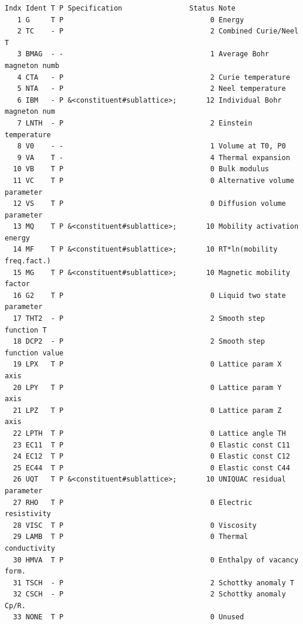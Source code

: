 \documentclass[11pt]{article}
\begin{document}
\begin{table}[!h]
  \caption{Current set of model parameter identifiers}\label{tab:mpis}
  {\small
\begin{verbatim}
Indx Ident T P Specification                Status Note
   1 G     T P                                   0 Energy
   2 TC    - P                                   2 Combined Curie/Neel T
   3 BMAG  - -                                   1 Average Bohr magneton numb
   4 CTA   - P                                   2 Curie temperature
   5 NTA   - P                                   2 Neel temperature
   6 IBM   - P &<constituent#sublattice>;       12 Individual Bohr magneton num
   7 LNTH  - P                                   2 Einstein temperature
   8 V0    - -                                   1 Volume at T0, P0
   9 VA    T -                                   4 Thermal expansion
  10 VB    T P                                   0 Bulk modulus
  11 VC    T P                                   0 Alternative volume parameter
  12 VS    T P                                   0 Diffusion volume parameter
  13 MQ    T P &<constituent#sublattice>;       10 Mobility activation energy
  14 MF    T P &<constituent#sublattice>;       10 RT*ln(mobility freq.fact.)
  15 MG    T P &<constituent#sublattice>;       10 Magnetic mobility factor
  16 G2    T P                                   0 Liquid two state parameter
  17 THT2  - P                                   2 Smooth step function T
  18 DCP2  - P                                   2 Smooth step function value
  19 LPX   T P                                   0 Lattice param X axis
  20 LPY   T P                                   0 Lattice param Y axis
  21 LPZ   T P                                   0 Lattice param Z axis
  22 LPTH  T P                                   0 Lattice angle TH
  23 EC11  T P                                   0 Elastic const C11
  24 EC12  T P                                   0 Elastic const C12
  25 EC44  T P                                   0 Elastic const C44
  26 UQT   T P &<constituent#sublattice>;       10 UNIQUAC residual parameter
  27 RHO   T P                                   0 Electric resistivity
  28 VISC  T P                                   0 Viscosity
  29 LAMB  T P                                   0 Thermal conductivity
  30 HMVA  T P                                   0 Enthalpy of vacancy form.
  31 TSCH  - P                                   2 Schottky anomaly T
  32 CSCH  - P                                   2 Schottky anomaly Cp/R.
  33 NONE  T P                                   0 Unused
\end{verbatim}
  }
\end{table}
 
\end{document}
